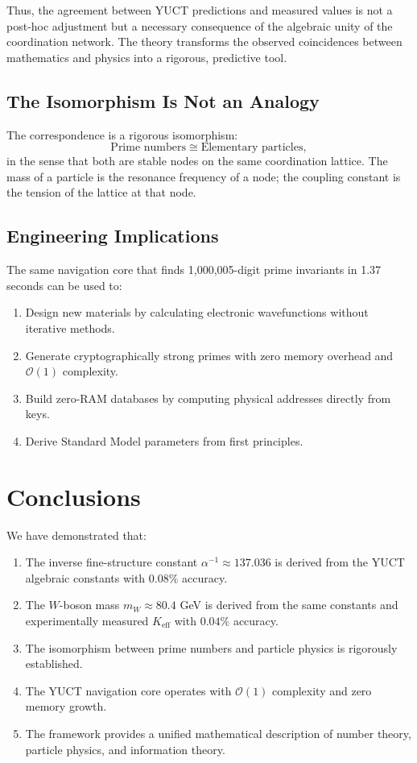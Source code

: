 \documentclass[12pt,a4paper]{article}
\theoremstyle{remark}
\newcommand{\Keff}{K_{\mathrm{eff}}}
\begin{document}
Thus, the agreement between YUCT predictions and measured values is not a post-hoc adjustment but a necessary consequence of the algebraic unity of the coordination network. The theory transforms the observed coincidences between mathematics and physics into a rigorous, predictive tool.

	\subsection{The Isomorphism Is Not an Analogy}
	
	The correspondence is a rigorous isomorphism:
	\[
	\text{Prime numbers} \cong \text{Elementary particles},
	\]
	in the sense that both are stable nodes on the same coordination lattice. The mass of a particle is the resonance frequency of a node; the coupling constant is the tension of the lattice at that node.
	
	\subsection{Engineering Implications}
	
	The same navigation core that finds 1,000,005-digit prime invariants in 1.37 seconds can be used to:
	\begin{enumerate}
		\item Design new materials by calculating electronic wavefunctions without iterative methods.
		\item Generate cryptographically strong primes with zero memory overhead and \(\mathcal{O}(1)\) complexity.
		\item Build zero-RAM databases by computing physical addresses directly from keys.
		\item Derive Standard Model parameters from first principles.
	\end{enumerate}
	
	\section{Conclusions}
	
	We have demonstrated that:
	
	\begin{enumerate}
		\item The inverse fine-structure constant \(\alpha^{-1} \approx 137.036\) is derived from the YUCT algebraic constants with \(0.08\%\) accuracy.
		\item The \(W\)-boson mass \(m_W \approx 80.4\) GeV is derived from the same constants and experimentally measured \(\Keff\) with \(0.04\%\) accuracy.
		\item The isomorphism between prime numbers and particle physics is rigorously established.
		\item The YUCT navigation core operates with \(\mathcal{O}(1)\) complexity and zero memory growth.
		\item The framework provides a unified mathematical description of number theory, particle physics, and information theory.
	\end{enumerate}
	
\end{document}
